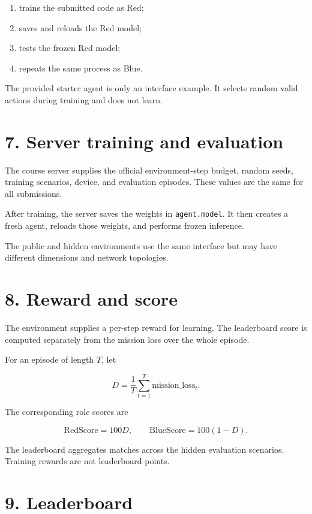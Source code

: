 \documentclass[12pt]{report}
\begin{document}
\begin{enumerate}[leftmargin=0.3in]
  \item trains the submitted code as Red;
  \item saves and reloads the Red model;
  \item tests the frozen Red model;
  \item repeats the same process as Blue.
\end{enumerate}

The provided starter agent is only an interface example. It selects random
valid actions during training and does not learn.

\section*{7. Server training and evaluation}

The course server supplies the official environment-step budget, random seeds,
training scenarios, device, and evaluation episodes. These values are the same
for all submissions.

After training, the server saves the weights in \texttt{agent.model}. It then
creates a fresh agent, reloads those weights, and performs frozen inference.

The public and hidden environments use the same interface but may have
different dimensions and network topologies.

\section*{8. Reward and score}

The environment supplies a per-step reward for learning. The leaderboard score
is computed separately from the mission loss over the whole episode.

For an episode of length $T$, let

\[
D = \frac{1}{T}\sum_{t=1}^{T}\text{mission\_loss}_t.
\]

The corresponding role scores are

\[
\text{RedScore}=100D,
\qquad
\text{BlueScore}=100(1-D).
\]

The leaderboard aggregates matches across the hidden evaluation scenarios.
Training rewards are not leaderboard points.

\section*{9. Leaderboard}
\end{document}

